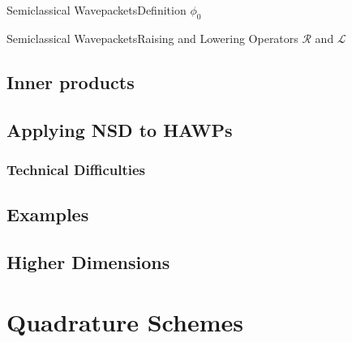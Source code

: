 \documentclass{beamer}
\begin{document}
\begin{frame}{Semiclassical Wavepackets}{Definition}
  $\phi_0$
\end{frame}


\begin{frame}{Semiclassical Wavepackets}{Raising and Lowering Operators}
  $\mathcal{R}$ and $\mathcal{L}$
\end{frame}




\subsection{Inner products}



\subsection{Applying NSD to HAWPs}
\subsubsection{Technical Difficulties}



\subsection{Examples}




\subsection{Higher Dimensions}





\section{Quadrature Schemes}
\end{document}
